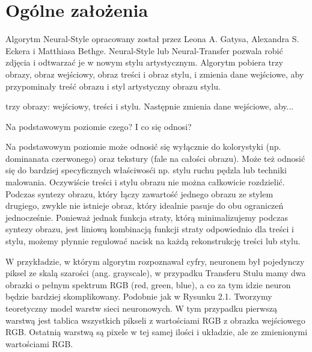 \documentclass[brudnopis]{xmgr}
\begin{document}
\section{Ogólne założenia\label{s:dsssl}}

Algorytm Neural-Style opracowany został przez Leona A. Gatysa, Alexandra S. Eckera i Matthiasa Bethge. Neural-Style lub Neural-Transfer pozwala robić zdjęcia i odtwarzać je w nowym stylu artystycznym. Algorytm pobiera trzy obrazy, obraz wejściowy, obraz treści i obraz stylu, i zmienia dane wejściowe, aby przypominały treść obrazu i styl artystyczny obrazu stylu.

trzy obrazy: wejściowy, treści i stylu. Następnie zmienia dane wejściowe, aby...

Na podstawowym poziomie czego? I co się odnosi?

Na podstawowym poziomie może odnosić się wyłącznie do kolorystyki (np. dominanata czerwonego) oraz tekstury (fale na całości obrazu).
Może też odnosić się do bardziej specyficznych właściwosći np. stylu ruchu pędzla lub techniki malowania. Oczywiście treści i stylu obrazu nie można całkowicie rozdzielić. Podczas syntezy obrazu, który łączy zawartość jednego obrazu ze stylem drugiego, zwykle nie istnieje obraz, który idealnie pasuje do obu ograniczeń jednocześnie. Ponieważ jednak funkcja straty, którą minimalizujemy podczas syntezy obrazu, jest liniową kombinacją funkcji straty odpowiednio dla treści i stylu, możemy płynnie regulować nacisk na każdą rekonstrukcję treści lub stylu.

W przykładzie, w którym algorytm rozpoznawał cyfry, neuronem był pojedynczy piksel ze skalą szarości (ang. grayscale), w przypadku Transferu Stulu mamy dwa obrazki o pełnym  spektrum RGB (red, green, blue), a co za tym idzie neuron będzie bardziej skomplikowany. Podobnie jak w Rysunku 2.1. Tworzymy teoretyczny model warstw sieci neuronowych. W tym przypadku pierwszą  warstwą jest tablica wszystkich pikseli z wartościami RGB z obrazka wejściowego RGB. Ostatnią warstwą  są pixele w tej samej ilości i układzie, ale ze zmienionymi wartościami RGB. 
\end{document}
